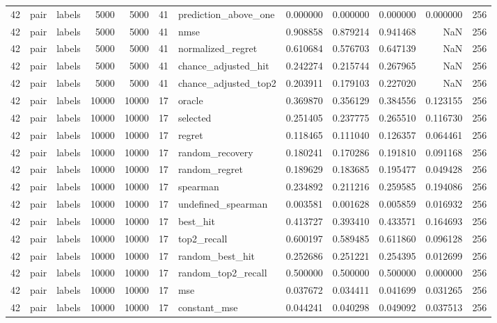 \begin{tabular}{rllrrrlrrrrr}
42 & pair & labels & 5000 & 5000 & 41 & prediction_above_one & 0.000000 & 0.000000 & 0.000000 & 0.000000 & 256 \\
42 & pair & labels & 5000 & 5000 & 41 & nmse & 0.908858 & 0.879214 & 0.941468 & NaN & 256 \\
42 & pair & labels & 5000 & 5000 & 41 & normalized_regret & 0.610684 & 0.576703 & 0.647139 & NaN & 256 \\
42 & pair & labels & 5000 & 5000 & 41 & chance_adjusted_hit & 0.242274 & 0.215744 & 0.267965 & NaN & 256 \\
42 & pair & labels & 5000 & 5000 & 41 & chance_adjusted_top2 & 0.203911 & 0.179103 & 0.227020 & NaN & 256 \\
42 & pair & labels & 10000 & 10000 & 17 & oracle & 0.369870 & 0.356129 & 0.384556 & 0.123155 & 256 \\
42 & pair & labels & 10000 & 10000 & 17 & selected & 0.251405 & 0.237775 & 0.265510 & 0.116730 & 256 \\
42 & pair & labels & 10000 & 10000 & 17 & regret & 0.118465 & 0.111040 & 0.126357 & 0.064461 & 256 \\
42 & pair & labels & 10000 & 10000 & 17 & random_recovery & 0.180241 & 0.170286 & 0.191810 & 0.091168 & 256 \\
42 & pair & labels & 10000 & 10000 & 17 & random_regret & 0.189629 & 0.183685 & 0.195477 & 0.049428 & 256 \\
42 & pair & labels & 10000 & 10000 & 17 & spearman & 0.234892 & 0.211216 & 0.259585 & 0.194086 & 256 \\
42 & pair & labels & 10000 & 10000 & 17 & undefined_spearman & 0.003581 & 0.001628 & 0.005859 & 0.016932 & 256 \\
42 & pair & labels & 10000 & 10000 & 17 & best_hit & 0.413727 & 0.393410 & 0.433571 & 0.164693 & 256 \\
42 & pair & labels & 10000 & 10000 & 17 & top2_recall & 0.600197 & 0.589485 & 0.611860 & 0.096128 & 256 \\
42 & pair & labels & 10000 & 10000 & 17 & random_best_hit & 0.252686 & 0.251221 & 0.254395 & 0.012699 & 256 \\
42 & pair & labels & 10000 & 10000 & 17 & random_top2_recall & 0.500000 & 0.500000 & 0.500000 & 0.000000 & 256 \\
42 & pair & labels & 10000 & 10000 & 17 & mse & 0.037672 & 0.034411 & 0.041699 & 0.031265 & 256 \\
42 & pair & labels & 10000 & 10000 & 17 & constant_mse & 0.044241 & 0.040298 & 0.049092 & 0.037513 & 256 \\

\end{tabular}
